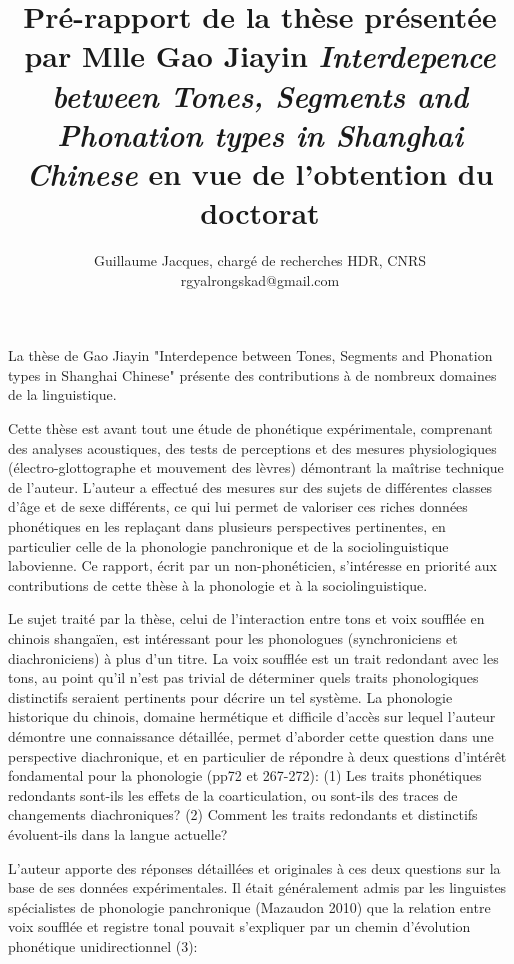 \documentclass[oldfontcommands,oneside,a4paper,11pt]{article}
\begin{document}
 
\title{Pré-rapport de la thèse présentée par Mlle Gao Jiayin \textit{Interdepence between Tones, Segments and Phonation types in Shanghai Chinese} en vue de l'obtention du doctorat }
\author{Guillaume Jacques, chargé de recherches HDR, CNRS\\rgyalrongskad@gmail.com}
\maketitle

La thèse de Gao Jiayin "Interdepence between Tones, Segments and Phonation types in Shanghai Chinese" présente des contributions à de nombreux domaines de la linguistique. 

Cette thèse est avant tout une étude de phonétique expérimentale, comprenant des analyses acoustiques, des tests de perceptions et des mesures physiologiques (électro-glottographe et mouvement des lèvres) démontrant la maîtrise technique de l'auteur.  L'auteur a effectué des mesures sur des sujets de différentes classes d'âge et de sexe différents, ce qui lui permet de valoriser ces riches données phonétiques en les replaçant dans plusieurs perspectives pertinentes, en particulier  celle de la phonologie panchronique et de la sociolinguistique labovienne. Ce rapport, écrit par un non-phonéticien, s'intéresse en priorité aux contributions de cette thèse à la phonologie et à la sociolinguistique.  

Le sujet traité par la thèse, celui de l'interaction entre tons et voix soufflée en chinois shangaïen, est intéressant pour les phonologues (synchroniciens et diachroniciens) à plus d'un titre. 
La voix soufflée est un trait redondant avec les tons, au point qu'il n'est pas trivial de déterminer quels traits phonologiques distinctifs seraient pertinents pour décrire un tel système. 
La phonologie historique du chinois, domaine hermétique et difficile d'accès sur lequel l'auteur démontre une connaissance détaillée, permet d'aborder cette question dans une perspective diachronique, et en particulier de répondre à deux questions d'intérêt fondamental pour la phonologie (pp72 et 267-272):
(1) Les traits phonétiques redondants sont-ils les effets de la coarticulation, ou sont-ils des traces de changements diachroniques?
(2) Comment les traits redondants et distinctifs évoluent-ils dans la langue actuelle?

L'auteur apporte des réponses détaillées et originales à ces deux questions sur la base de ses données expérimentales. Il était généralement admis par les linguistes spécialistes de phonologie panchronique (Mazaudon 2010) que la relation entre voix soufflée et registre tonal pouvait s'expliquer par un chemin d'évolution phonétique unidirectionnel (3):
\end{document}
